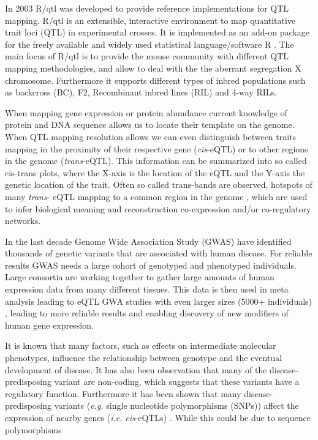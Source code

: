 In 2003 R/qtl was developed to provide reference implementations for QTL mapping. R/qtl is 
an extensible, interactive environment to map quantitative trait loci (QTL) in experimental 
crosses. It is implemented as an add-on package for the freely available and widely used 
statistical language/software R \cite{R:2009}. The main focus of R/qtl is to provide 
the mouse community with different QTL mapping methodologies, and allow to deal with the 
the aberrant segregation X chromosome. Furthermore it supports different types of inbred 
populations such as backcross (BC), F2, Recombinant inbred lines (RIL) and 4-way RILs. \cite{Broman:2003}

When mapping gene expression or protein abundance current knowledge of protein and DNA sequence 
allows us to locate their template on the genome. When QTL mapping resolution allows we can even 
distinguish between traits mapping in the proximity of their respective gene (\emph{cis}-eQTL) 
or to other regions in the genome (\emph{trans}-eQTL). This information can be summarized into 
so called cis-trans plots, where the X-axis is the location of the eQTL and the Y-axis the genetic 
location of the trait. Often so called trans-bands are observed, hotspots of many \emph{trans}-
eQTL mapping to a common region in the genome \cite{Breitling:2008a}, which are used to infer 
biological meaning and reconstruction co-expression and/or co-regulatory networks.

In the last decade Genome Wide Association Study (GWAS) have identified thousands of genetic 
variants that are associated with human disease\cite{Hindorff:2009}. For reliable results GWAS 
needs a large cohort of genotyped and phenotyped individuals. Large consortia are working 
together to gather large amounts of human expression data from many different tissues. This 
data is then used in meta analysis leading to eQTL GWA studies with even larger sizes 
(5000+ individuals) \cite{Lude:2011}, leading to more reliable results and enabling discovery 
of new modifiers of human gene expression.

It is known that many factors, such as effects on intermediate molecular phenotypes, influence 
the relationship between genotype and the eventual development of disease. It has also been 
observation that many of the disease-predisposing variant are non-coding, which suggests that 
these variants have a regulatory function. Furthermore it has been shown that many disease-predisposing variants 
(\emph{e.g.} single nucleotide polymorphisms (SNPs)) affect the expression of nearby genes (\emph{i.e.} 
\emph{cis}-eQTLs) \cite{Powell:2012, Lude:2011, Zeller:2010}. While this could be due to sequence 
polymorphisms 

